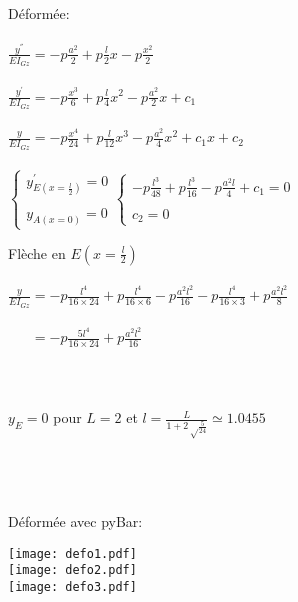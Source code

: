 \documentclass[a4paper]{article}
\begin{document}
~\\
~\\
~\\
\begin{minipage}[t]{9cm}
Déformée:\\
~\\
$\frac{y^{''}}{EI_{Gz}} =
- p\frac{a^2}{2}
+ p\frac{l}{2}x
- p\frac{x^2}{2}$\\
~\\
$\frac{y^{'}}{EI_{Gz}} =
- p\frac{x^3}{6}
+ p\frac{l}{4}x^2
- p\frac{a^2}{2}x + c_1$\\
~\\
$\frac{y}{EI_{Gz}} =
- p\frac{x^4}{24}
+ p\frac{l}{12}x^3
- p\frac{a^2}{4}x^2 + c_1x + c_2$\\
~\\
$\begin{cases}
y^{'}_{E(x=\frac{l}{2})} = 0\\
~\\
y_{A(x=0)} = 0
\end{cases}
\begin{cases}
- p\frac{l^3}{48}
+ p\frac{l^3}{16}
- p\frac{a^2l}{4} + c_1 = 0\\
~\\
c_2 = 0
\end{cases}$
\end{minipage}
\begin{minipage}[t]{10cm}
Flèche en $E(x=\frac{l}{2})$\\
~\\
$\frac{y}{EI_{Gz}} = -p\frac{l^4}{16\times24}+p\frac{l^4}{16\times6}
 -p\frac{a^2l^2}{16}-p\frac{l^4}{16\times3}+p\frac{a^2l^2}{8}$\\
~\\
$\phantom{\frac{y}{EI_{Gz}}} = -p\frac{5l^4}{16\times24}+p\frac{a^2l^2}{16}$\\
~\\
\hfill
{}\\
~\\
$y_E=0$ pour $L=2$ et $l=\frac{L}{1+2\sqrt\frac{5}{24}} \simeq 1.0455$
\end{minipage}
~\\
~\\
~\\
Déformée avec pyBar:\\
\begin{center}
\texttt{[image: defo1.pdf]}\\
\texttt{[image: defo2.pdf]}\\
\texttt{[image: defo3.pdf]}
\end{center}
\end{document}

